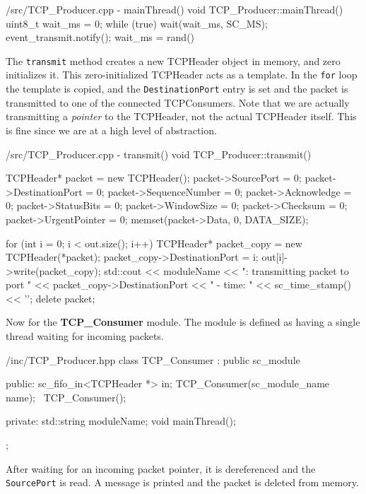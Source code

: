 \documentclass[../main.tex]{subfiles}
\begin{document}
\begin{myminted}{/src/TCP\_Producer.cpp - mainThread()}
void TCP_Producer::mainThread() {
    uint8_t wait_ms = 0;
    while (true) {
        wait(wait_ms, SC_MS); 
        event_transmit.notify();
        wait_ms = rand() %
    }
}
\end{myminted}

The \texttt{transmit} method creates a new TCPHeader object in memory, and zero initializes it. This zero-initialized TCPHeader acts as a template. In the \texttt{for} loop the template is copied, and the \texttt{DestinationPort} entry is set and the packet is transmitted to one of the connected TCPConsumers. Note that we are actually transmitting a \textit{pointer} to the TCPHeader, not the actual TCPHeader itself. This is fine since we are at a high level of abstraction. 

\begin{myminted}{/src/TCP\_Producer.cpp - transmit()}
void TCP_Producer::transmit() {
    TCPHeader* packet = new TCPHeader();
    packet->SourcePort         = 0;
    packet->DestinationPort    = 0;
    packet->SequenceNumber     = 0;    
    packet->Acknowledge        = 0;
    packet->StatusBits         = 0;
    packet->WindowSize         = 0;
    packet->Checksum           = 0;
    packet->UrgentPointer      = 0;
    memset(packet->Data, 0, DATA_SIZE);

    for (int i = 0; i < out.size(); i++) {
        TCPHeader* packet_copy = new TCPHeader(*packet);
        packet_copy->DestinationPort = i;
        out[i]->write(packet_copy);
        std::cout << moduleName << ": transmitting packet to port " << packet_copy->DestinationPort
                  << " - time: " << sc_time_stamp() << '\n';
    }
    delete packet;
}
\end{myminted}

\newpage

Now for the \textbf{TCP\_Consumer} module. The module is defined as having a single thread waiting for incoming packets.

\begin{myminted}{/inc/TCP\_Producer.hpp}
class TCP_Consumer : public sc_module {
public:
    sc_fifo_in<TCPHeader *> in;
    TCP_Consumer(sc_module_name name);
    ~TCP_Consumer();

private:
    std::string moduleName;
    void mainThread();
};
\end{myminted}

After waiting for an incoming packet pointer, it is dereferenced and the \texttt{SourcePort} is read. A message is printed and the packet is deleted from memory.
\end{document}
